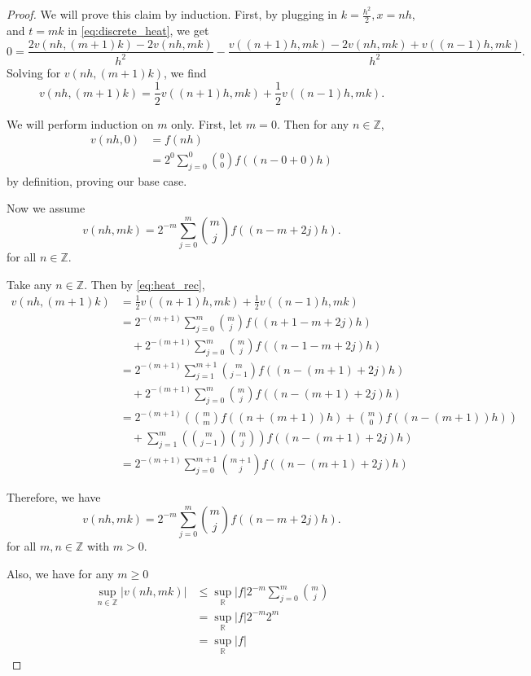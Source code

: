 \documentclass[a4paper]{article}
\newcommand{\R}{\mathbb{R}}
\newcommand{\Z}{\mathbb{Z}}
\begin{document}
\begin{enumerate}
    \begin{proof}
      We will prove this claim by induction.
      First, by plugging in $k=\frac{h^2}{2}, x = nh$, and $t = mk$ in \eqref{eq:discrete_heat}, we get
      \begin{equation} \label{eq:heat_rec}
        0 = \frac{2 v(nh, (m+1)k) - 2v(nh,mk)}{h^2} - \frac{v((n+1)h,mk) - 2v(nh,mk) + v(( n-1)h,mk) }{h^2} .
      \end{equation}
      Solving for $v(nh,(m+1)k)$, we find
      \[ v(nh,(m+1)k) = \frac{1}{2} v( (n+1)h, mk) + \frac{1}{2} v( (n-1)h, mk) .\]

      We will perform induction on $m$ only. First, let $m=0$. Then for any $n \in \Z$,
      \begin{align*}
        v(nh,0) &= f(nh) \\
        &= 2^{0} \sum_{j=0}^0 \binom{0}{0} f( (n - 0 + 0)h)
      \end{align*}
      by definition, proving our base case.

      Now we assume
      \[ v(nh, mk) = 2^{-m} \sum_{j=0}^m \binom{m}{j} f \left( (n - m + 2j)h \right) .\]
      for all $n \in \Z$.

      Take any $n \in \Z$. Then by \eqref{eq:heat_rec},
      \begin{align*}
        v(nh, (m+1)k) &= \frac{1}{2} v( (n+1)h, mk) + \frac{1}{2} v( (n-1)h, mk) \\
        &= 2^{-(m+1)} \sum_{j=0}^m \binom{m}{j} f( (n+1-m+2j)h) \\
        &\quad + 2^{-(m+1)} \sum_{j=0}^m \binom{m}{j} f( (n-1-m+2j)h) \\
        &= 2^{-(m+1)} \sum_{j=1}^{m+1} \binom{m}{j-1} f( (n-(m+1)+2j)h) \\
        &\quad + 2^{-(m+1)} \sum_{j=0}^m \binom{m}{j} f( (n-(m+1)+2j)h) \\
        &= 2^{-(m+1)} \left( \binom{m}{m} f( (n + (m+1) )h) + \binom{m}{0} f( (n - (m+1))h) \right) \\
        &\quad + \sum_{j=1}^m \left( \binom{m}{j-1} \binom{m}{j} \right) f( (n-(m+1)+2j)h) \\
        &= 2^{-(m+1)} \sum_{j=0}^{m+1} \binom{m+1}{j} f( (n-(m+1)+2j)h)
      \end{align*}

      Therefore, we have
      \[ v(nh, mk) = 2^{-m} \sum_{j=0}^m \binom{m}{j} f \left( (n - m + 2j)h \right) .\]
      for all $m,n \in \Z$ with $m>0$.

      Also, we have for any $m\geq 0$
      \begin{align*}
        \sup_{n \in \Z} |v(nh,mk)| &\leq \sup_\R |f| 2^{-m} \sum_{j=0}^m \binom{m}{j} \\
        &= \sup_\R |f| 2^{-m} 2^m \\
        &= \sup_\R |f|
      \end{align*}


\end{proof}
\end{enumerate}
\end{document}
